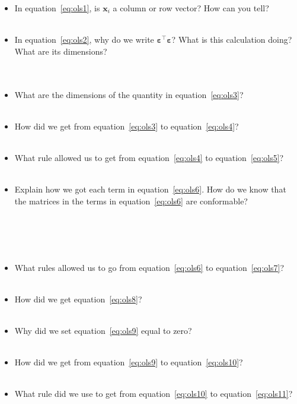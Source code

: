 \documentclass[12pt, letterpaper]{article}
\begin{document}
\begin{enumerate}
\begin{itemize}
\item In equation~\ref{eq:ols1}, is $\mathbf{x}_{i}$ a column or row vector? How can you tell?
\\
\\
\item In equation~\ref{eq:ols2}, why do we write $\boldsymbol{\varepsilon}^\intercal \boldsymbol{\varepsilon}$? What is this calculation doing? What are its dimensions?
\\
\\
\\
\item What are the dimensions of the quantity in equation~\ref{eq:ols3}?
\\
\\
\item How did we get from equation~\ref{eq:ols3} to equation~\ref{eq:ols4}?
\\
\\
\item What rule allowed us to get from equation~\ref{eq:ols4} to equation~\ref{eq:ols5}?
\\
\\
\item Explain how we got each term in equation~\ref{eq:ols6}. How do we know that the matrices in the terms in equation~\ref{eq:ols6} are conformable?
\\
\\
\\
\\
\\
\item What rules allowed us to go from equation~\ref{eq:ols6} to equation~\ref{eq:ols7}?
\\
\\ 
\item How did we get equation~\ref{eq:ols8}?
\\
\\
\item Why did we set equation~\ref{eq:ols9} equal to zero?
\\
\\
\item How did we get from equation~\ref{eq:ols9} to equation~\ref{eq:ols10}?
\\
\\
\item What rule did we use to get from equation~\ref{eq:ols10} to equation~\ref{eq:ols11}?
\\
\\
\end{itemize}





\end{enumerate}
\end{document}
